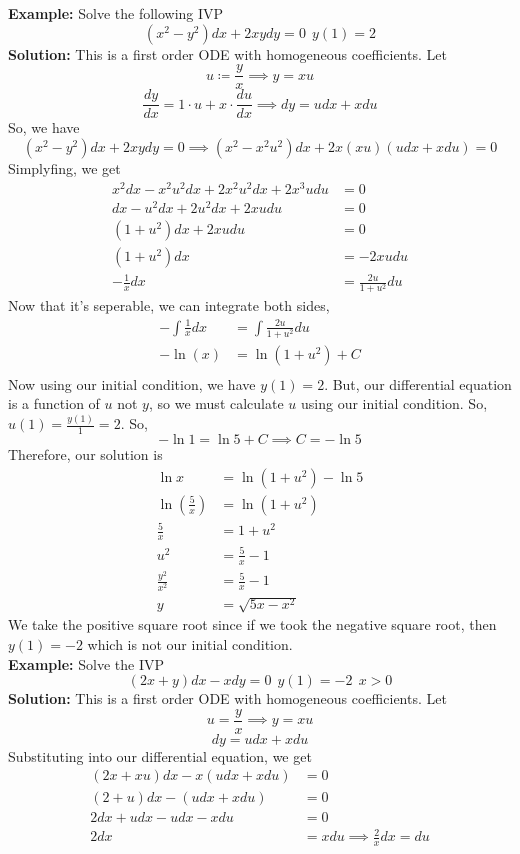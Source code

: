 \documentclass[openany]{report}
\begin{document}
\noindent
\textbf{Example:} Solve the following IVP 
\[(x^2-y^2)dx + 2xydy = 0 \ \ y(1) = 2\]
\textbf{Solution:} This is a first order ODE with homogeneous coefficients. Let 
\[u \coloneqq \frac{y}{x} \implies y = xu\]
\[\frac{dy}{dx} = 1 \cdot u + x \cdot \frac{du}{dx} \implies dy = udx + xdu\]
So, we have 
\[(x^2-y^2)dx + 2xydy = 0 \implies (x^2 - x^2u^2)dx + 2x(xu)(udx + xdu) = 0\]
Simplyfing, we get 
\begin{align*}
    x^2dx - x^2u^2dx + 2x^2u^2dx + 2x^3udu &= 0\\
    dx - u^2dx + 2u^2dx + 2xudu &= 0\\
    (1 + u^2)dx + 2xudu &= 0\\
    (1+u^2)dx &= -2xudu\\
    -\frac{1}{x}dx &= \frac{2u}{1+u^2}du
\end{align*}
Now that it's seperable, we can integrate both sides,
\begin{align*}
    -\int \frac{1}{x}dx &= \int \frac{2u}{1+u^2}du\\
    -\ln(x) &= \ln(1+u^2) + C\\
\end{align*}
Now using our initial condition, we have $y(1) = 2$. But, our differential equation is a function of $u$ not $y$, so we must calculate $u$ using our initial condition. So, $u(1) = \frac{y(1)}{1} = 2$. So, 
\[-\ln 1 = \ln 5 + C \implies C = -\ln 5\]
Therefore, our solution is
\begin{align*}
    \ln x &= \ln(1 + u^2) - \ln 5\\
    \ln\left(\frac{5}{x}\right) &= \ln(1 + u^2)\\
    \frac{5}{x} &= 1 + u^2\\
    u^2 &= \frac{5}{x} - 1\\
    \frac{y^2}{x^2} &= \frac{5}{x} - 1\\
    y &= \sqrt{5x - x^2}
\end{align*}
We take the positive square root since if we took the negative square root, then $y(1) = -2$ which is not our initial condition.\\[2ex]
\textbf{Example:} Solve the IVP 
\[(2x + y)dx - xdy = 0 \ \ y(1) = -2 \ \ x > 0\]
\textbf{Solution:} This is a first order ODE with homogeneous coefficients. Let
\[u = \frac{y}{x} \implies y = xu\]
\[dy = udx + xdu\]
Substituting into our differential equation, we get
\begin{align*}
    (2x + xu)dx - x(udx + xdu) &= 0\\
    (2+u)dx - (udx + xdu) &= 0\\  
    2dx + udx - udx - xdu &= 0\\
    2dx &= xdu \implies \frac{2}{x}dx = du
\end{align*}
\end{document}
